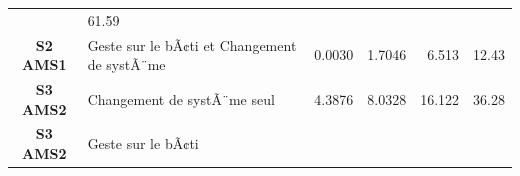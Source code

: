 \documentclass[]{article}
\begin{document}
\begin{longtable}[]{@{}clrrrr@{}}
\begin{minipage}[t]{0.09\columnwidth}
\end{minipage} & \begin{minipage}[t]{0.09\columnwidth}\raggedleft\strut
61.59\strut
\end{minipage}\tabularnewline
\begin{minipage}[t]{0.17\columnwidth}\centering\strut
\textbf{S2 AMS1}\strut
\end{minipage} & \begin{minipage}[t]{0.29\columnwidth}\raggedright\strut
Geste sur le bÃ¢ti et Changement de systÃ¨me\strut
\end{minipage} & \begin{minipage}[t]{0.09\columnwidth}\raggedleft\strut
0.0030\strut
\end{minipage} & \begin{minipage}[t]{0.09\columnwidth}\raggedleft\strut
1.7046\strut
\end{minipage} & \begin{minipage}[t]{0.09\columnwidth}\raggedleft\strut
6.513\strut
\end{minipage} & \begin{minipage}[t]{0.09\columnwidth}\raggedleft\strut
12.43\strut
\end{minipage}\tabularnewline
\begin{minipage}[t]{0.17\columnwidth}\centering\strut
\textbf{S3 AMS2}\strut
\end{minipage} & \begin{minipage}[t]{0.29\columnwidth}\raggedright\strut
Changement de systÃ¨me seul\strut
\end{minipage} & \begin{minipage}[t]{0.09\columnwidth}\raggedleft\strut
4.3876\strut
\end{minipage} & \begin{minipage}[t]{0.09\columnwidth}\raggedleft\strut
8.0328\strut
\end{minipage} & \begin{minipage}[t]{0.09\columnwidth}\raggedleft\strut
16.122\strut
\end{minipage} & \begin{minipage}[t]{0.09\columnwidth}\raggedleft\strut
36.28\strut
\end{minipage}\tabularnewline
\begin{minipage}[t]{0.17\columnwidth}\centering\strut
\textbf{S3 AMS2}\strut
\end{minipage} & \begin{minipage}[t]{0.29\columnwidth}\raggedright\strut
Geste sur le bÃ¢ti\strut

\end{minipage}
\end{longtable}
\end{document}
